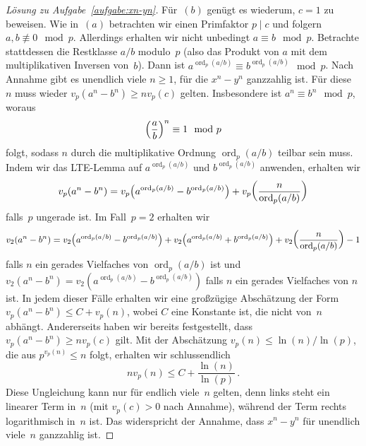 \begin{proof}[Lösung zu Aufgabe~\ref{aufgabe:xn-yn}]
	Für~$(b)$ genügt es wiederum, $c=1$ zu beweisen. Wie in~$(a)$ betrachten wir einen Primfaktor $p\mid c$ und folgern $a,b\not\equiv 0\mod p$. Allerdings erhalten wir nicht unbedingt $a\equiv b\mod p$. Betrachte stattdessen die Restklasse $a/b$ modulo~$p$ (also das Produkt von $a$ mit dem multiplikativen Inversen von~$b$). Dann ist $a^{\operatorname{ord}_p(a/b)}\equiv b^{\operatorname{ord}_p(a/b)}\mod p$. Nach Annahme gibt es unendlich viele $n\geqslant 1$, für die $x^n-y^n$ ganzzahlig ist. Für diese~$n$ muss wieder $v_p(a^n-b^n)\geqslant nv_p(c)$ gelten. Insbesondere ist $a^n\equiv b^n\mod p$, woraus
	\begin{equation*}
		\parens*{\frac{a}{b}}^n\equiv 1\mod p
	\end{equation*}
	folgt, sodass $n$ durch die multiplikative Ordnung $\operatorname{ord}_p(a/b)$ teilbar sein muss. Indem wir das LTE-Lemma auf $a^{\operatorname{ord}_p(a/b)}$ und $b^{\operatorname{ord}_p(a/b)}$ anwenden, erhalten wir
	\begin{equation*}
		v_p\parens*{a^n-b^n}=v_p\parens*{a^{\operatorname{ord}_p(a/b)}- b^{\operatorname{ord}_p(a/b)}}+v_p\parens*{\frac{n}{\operatorname{ord}_p(a/b)}}
	\end{equation*}
	falls~$p$ ungerade ist. Im Fall~$p=2$ erhalten wir
	\begin{equation*}
		v_2\parens*{a^n-b^n}=v_2\parens*{a^{\operatorname{ord}_p(a/b)}- b^{\operatorname{ord}_p(a/b)}}+v_2\parens*{a^{\operatorname{ord}_p(a/b)}+ b^{\operatorname{ord}_p(a/b)}}+v_2\parens*{\frac{n}{\operatorname{ord}_p(a/b)}}-1
	\end{equation*}
	falls $n$ ein gerades Vielfaches von $\operatorname{ord}_p(a/b)$ ist und $v_2(a^n-b^n)=v_2(a^{\operatorname{ord}_p(a/b)}- b^{\operatorname{ord}_p(a/b)})$ falls $n$ ein gerades Vielfaches von $n$ ist. In jedem dieser Fälle erhalten wir eine großzügige Abschätzung der Form $v_p(a^n-b^n)\leqslant C+v_p(n)$, wobei $C$ eine Konstante ist, die nicht von~$n$ abhängt. Andererseits haben wir bereits festgestellt, dass $v_p(a^n-b^n)\geqslant nv_p(c)$ gilt. Mit der Abschätzung $v_p(n)\leqslant \ln(n)/\ln(p)$, die aus $p^{v_p(n)}\leqslant n$ folgt, erhalten wir schlussendlich
	\begin{equation*}
		nv_p(n)\leqslant C+\frac{\ln(n)}{\ln(p)}\,.
	\end{equation*}
	Diese Ungleichung kann nur für endlich viele~$n$ gelten, denn links steht ein linearer Term in~$n$ (mit $v_p(c)>0$ nach Annahme), während der Term rechts logarithmisch in~$n$ ist. Das widerspricht der Annahme, dass $x^n-y^n$ für unendlich viele~$n$ ganzzahlig ist.
\end{proof}

